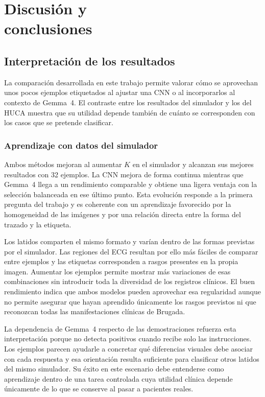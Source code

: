 \chapter[Discusión y conclusiones]{Discusión y\\ conclusiones}
\label{chap:conclusiones}

\section{Interpretación de los resultados}

La comparación desarrollada en este trabajo permite valorar cómo se aprovechan unos pocos ejemplos etiquetados al ajustar una CNN o al incorporarlos al contexto de Gemma~4. El contraste entre los resultados del simulador y los del HUCA muestra que su utilidad depende también de cuánto se corresponden con los casos que se pretende clasificar.

\subsection{Aprendizaje con datos del simulador}

Ambos métodos mejoran al aumentar \(K\) en el simulador y alcanzan sus mejores resultados con 32 ejemplos. La CNN mejora de forma continua mientras que Gemma~4 llega a un rendimiento comparable y obtiene una ligera ventaja con la selección balanceada en ese último punto. Esta evolución responde a la primera pregunta del trabajo y es coherente con un aprendizaje favorecido por la homogeneidad de las imágenes y por una relación directa entre la forma del trazado y la etiqueta.

Los latidos comparten el mismo formato y varían dentro de las formas previstas por el simulador. Las regiones del ECG resultan por ello más fáciles de comparar entre ejemplos y las etiquetas corresponden a rasgos presentes en la propia imagen. Aumentar los ejemplos permite mostrar más variaciones de esas combinaciones sin introducir toda la diversidad de los registros clínicos. El buen rendimiento indica que ambos modelos pueden aprovechar esa regularidad aunque no permite asegurar que hayan aprendido únicamente los rasgos previstos ni que reconozcan todas las manifestaciones clínicas de Brugada.

La dependencia de Gemma~4 respecto de las demostraciones refuerza esta interpretación porque no detecta positivos cuando recibe solo las instrucciones. Los ejemplos parecen ayudarle a concretar qué diferencias visuales debe asociar con cada respuesta y esa orientación resulta suficiente para clasificar otros latidos del mismo simulador. Su éxito en este escenario debe entenderse como aprendizaje dentro de una tarea controlada cuya utilidad clínica depende únicamente de lo que se conserve al pasar a pacientes reales.

